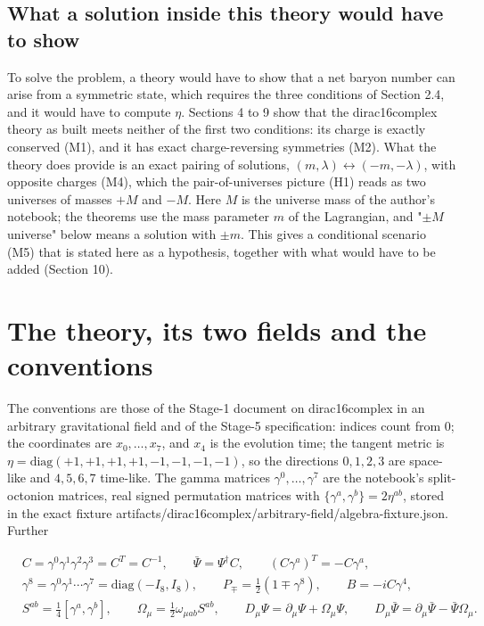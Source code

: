 \documentclass[11pt]{article}
\begin{document}
\subsection{What a solution inside this theory would have to show}

To solve the problem, a theory would have to show that a net baryon number can arise from a symmetric state, which requires the three conditions of Section 2.4, and it would have to compute $\eta$. Sections 4 to 9 show that the dirac16complex theory as built meets neither of the first two conditions: its charge is exactly conserved (M1), and it has exact charge-reversing symmetries (M2). What the theory does provide is an exact pairing of solutions, $(m,\lambda)\leftrightarrow(-m,-\lambda)$, with opposite charges (M4), which the pair-of-universes picture (H1) reads as two universes of masses $+M$ and $-M$. Here $M$ is the universe mass of the author's notebook; the theorems use the mass parameter $m$ of the Lagrangian, and "$\pm M$ universe" below means a solution with $\pm m$. This gives a conditional scenario (M5) that is stated here as a hypothesis, together with what would have to be added (Section 10).

\section{The theory, its two fields and the conventions}

The conventions are those of the Stage-1 document on dirac16complex in an arbitrary gravitational field and of the Stage-5 specification: indices count from 0; the coordinates are $x_0,\dots,x_7$, and $x_4$ is the evolution time; the tangent metric is $\eta=\mathrm{diag}(+1,+1,+1,+1,-1,-1,-1,-1)$, so the directions $0,1,2,3$ are space-like and $4,5,6,7$ time-like. The gamma matrices $\gamma^0,\dots,\gamma^7$ are the notebook's split-octonion matrices, real signed permutation matrices with $\{\gamma^a,\gamma^b\}=2\eta^{ab}$, stored in the exact fixture artifacts/dirac16complex/arbitrary-field/algebra-fixture.json. Further

\[
\begin{aligned}
&C=\gamma^0\gamma^1\gamma^2\gamma^3=C^T=C^{-1},\qquad \bar\Psi=\Psi^\dagger C,\qquad (C\gamma^a)^T=-C\gamma^a,\\
&\gamma^8=\gamma^0\gamma^1\cdots\gamma^7=\mathrm{diag}(-I_8,I_8),\qquad P_\mp=\tfrac12(1\mp\gamma^8),\qquad B=-iC\gamma^4,\\
&S^{ab}=\tfrac14[\gamma^a,\gamma^b],\qquad \Omega_\mu=\tfrac12\omega_{\mu ab}S^{ab},\qquad D_\mu\Psi=\partial_\mu\Psi+\Omega_\mu\Psi,\qquad D_\mu\bar\Psi=\partial_\mu\bar\Psi-\bar\Psi\Omega_\mu .
\end{aligned}
\]
\end{document}

